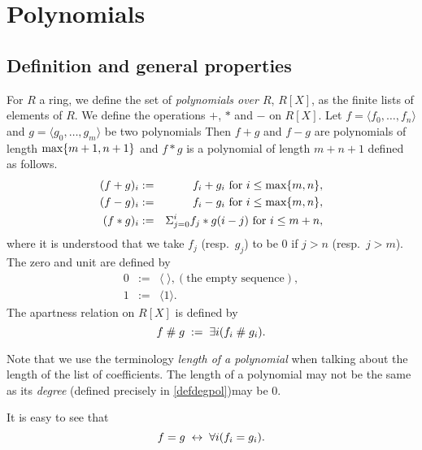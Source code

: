 
\section{Polynomials}

\subsection{Definition and general properties}
\begin{definition}
For $R$ a ring, we define the set of {\em polynomials over $R$},
$R[X]$, as the finite lists of elements of $R$. We define the operations $+$,
$*$ and $-$  on $R[X]$. Let $f= \langle f_0, \ldots,
f_n\rangle $ and $g= \langle g_0, \ldots, g_m\rangle $ be two
polynomials 
Then $f+g$ and $f-g$ are polynomials of length $\mbox{max}\{ m+1,n+1\}$ and
$f*g$ is a polynomial of length $m+n+1$ defined as follows.
\begin{eqnarray*}
  (f+g)_i &:=& f_i + g_i \mbox{ for } i \leq \mbox{max}\{ m,n\},\\
  (f-g)_i &:=& f_i - g_i \mbox{ for } i \leq \mbox{max}\{ m,n\},\\
  (f*g)_i &:=& \Sigma_{j=0}^i f_j * g(i-j) \mbox{ for } i \leq m+n,
\end{eqnarray*}
where it is understood that we take $f_j$ (resp.\ $g_j$) to be $0$ if
$j>n$ (resp.\ $j>m$). The zero and unit are defined by
\begin{eqnarray*}
  0 &:=& \langle\; \rangle, (\mbox{the empty sequence}),\\
  1&:=&\langle 1\rangle.
\end{eqnarray*}
The apartness relation on $R[X]$ is defined by
$$ f \mathrel{\#} g \; := \; \exists i(f_i \mathrel{\#} g_i).$$
\end{definition}

Note that we use the terminology {\em length of a polynomial\/} when
talking about the length of the list of coefficients. The length of a
polynomial may not be the same as its {\em degree} (defined
precisely in \ref{defdegpol})may be $0$.

It is easy to see that
$$ f =g \; \leftrightarrow \; \forall i(f_i = g_i).$$

